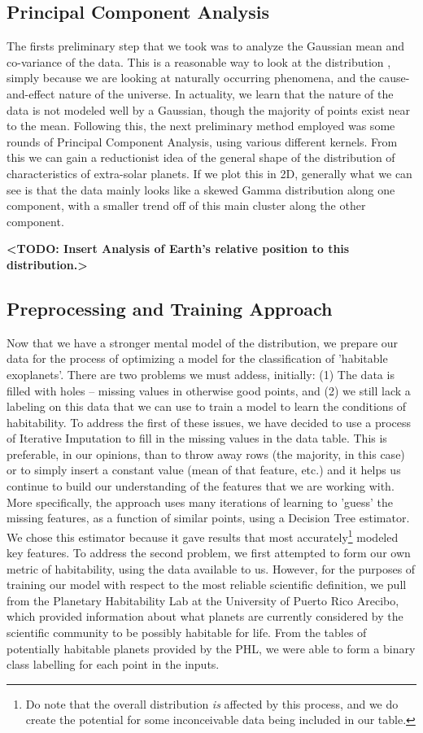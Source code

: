\documentclass[11.5pt]{article}
\begin{document}
\subsection{Principal Component Analysis} 
The firsts preliminary step that we took was to analyze the Gaussian mean and co-variance of the data. This is a reasonable way to look at the distribution , simply because we are looking at naturally occurring phenomena, and the cause-and-effect nature of the universe. In actuality, we learn that the nature of the data is not modeled well by a Gaussian, though the majority of points exist near to the mean. Following this, the next preliminary method employed was some rounds of Principal Component Analysis, using various different kernels. From this we can gain a reductionist idea of the general shape of the distribution of characteristics of extra-solar planets. If we plot this in 2D, generally what we can see is that the data mainly looks like a skewed Gamma distribution along one component, with a smaller trend off of this main cluster along the other component.

 \textbf{<TODO: Insert Analysis of Earth's relative position to this distribution.>} 
 
\subsection{Preprocessing and Training Approach}
Now that we have a stronger mental model of the distribution, we prepare our data for the process of optimizing a model for the classification of 'habitable exoplanets'. There are two problems we must addess, initially: (1) The data is filled with holes -- missing values in otherwise good points, and (2) we still lack a labeling on this data that we can use to train a model to learn the conditions of habitability. To address the first of these issues, we have decided to use a process of Iterative Imputation to fill in the missing values in the data table. This is preferable, in our opinions, than to throw away rows (the majority, in this case) or to simply insert a constant value (mean of that feature, etc.) and it helps us continue to build our understanding of the features that we are working with. More specifically, the approach uses many iterations of learning to 'guess' the missing features, as a function of similar points, using a Decision Tree estimator. We chose this estimator because it gave results that most accurately\footnote{Do note that the overall distribution \emph{is} affected by this process, and we do create the potential for some inconceivable data being included in our table.} modeled key features. To address the second problem, we first attempted to form our own metric of habitability, using the data available to us. However, for the purposes of training our model with respect to the most reliable scientific definition, we pull from the Planetary Habitability Lab at the University of Puerto Rico Arecibo, which provided information about what planets are currently considered by the scientific community to be possibly habitable for life. From the tables of potentially habitable planets provided by the PHL, we were able to form a binary class labelling for each point in the inputs. 
\end{document}

